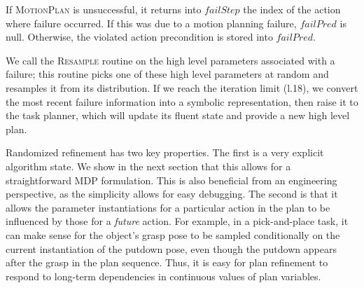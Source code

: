 If \textsc{MotionPlan} is unsuccessful, it returns into $failStep$ the index of the action where failure occurred.
If this was due to a motion planning failure, $failPred$ is null. Otherwise,
the violated action precondition is stored into $failPred$.

We call the \textsc{Resample} routine on the high level parameters
associated with a failure; this routine picks one of these high level parameters at random and
resamples it from its distribution. If we reach the iteration limit (l.18),
we convert the most recent failure information into a symbolic representation, then raise it
to the task planner, which will update its fluent state and provide a new
high level plan.

Randomized refinement has two key properties. The first is a very explicit algorithm state.
We show in the next section that this allows for a straightforward MDP
formulation. This is also beneficial from an
engineering perspective, as the simplicity allows for easy debugging. The second is that
it allows the parameter instantiations for a particular action in
the plan to be influenced by those for a \emph{future} action. For example, in a
pick-and-place task, it can make sense for the object's grasp pose to be sampled
conditionally on the current instantiation of the putdown pose, even though the putdown
appears after the grasp in the plan sequence. Thus, it is easy for plan refinement to
respond to long-term dependencies in continuous values of plan variables.